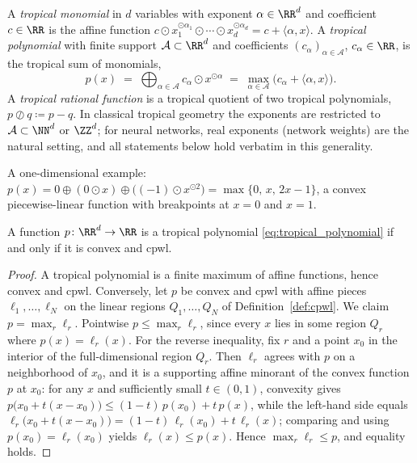 \begin{definition}\label{def:tropical_polynomial}
A \emph{tropical monomial} in $d$ variables with exponent $\alpha \in \RR^{d}$ and coefficient $c \in \RR$ is the affine function $c \odot x_1^{\odot \alpha_1} \odot \cdots \odot x_d^{\odot \alpha_d} = c + \langle \alpha, x \rangle$. A \emph{tropical polynomial} with finite support $\mathcal{A} \subset \RR^{d}$ and coefficients $(c_{\alpha})_{\alpha \in \mathcal{A}}$, $c_\alpha \in \RR$, is the tropical sum of monomials,
\begin{equation}
	p(x) \;=\; \bigoplus_{\alpha \in \mathcal{A}} c_{\alpha} \odot x^{\odot \alpha}
	\;=\; \max_{\alpha \in \mathcal{A}} \bigl( c_{\alpha} + \langle \alpha, x \rangle \bigr).
	\label{eq:tropical_polynomial}
\end{equation}
A \emph{tropical rational function} is a tropical quotient of two tropical polynomials, $p \oslash q \coloneqq p - q$. In classical tropical geometry \cite{MaclaganSturmfels2015tropical} the exponents are restricted to $\mathcal{A} \subset \NN^{d}$ or $\ZZ^{d}$; for neural networks, real exponents (network weights) are the natural setting, and all statements below hold verbatim in this generality.
\end{definition}

A one-dimensional example: $p(x) = 0 \oplus (0 \odot x) \oplus \bigl((-1) \odot x^{\odot 2}\bigr) = \max\{0,\, x,\, 2x - 1\}$, a convex piecewise-linear function with breakpoints at $x = 0$ and $x = 1$.

\begin{observation}\label{obs:tropical_convex_cpwl}
A function $p \colon \RR^d \to \RR$ is a tropical polynomial \eqref{eq:tropical_polynomial} if and only if it is convex and \ac{cpwl}.
\end{observation}

\begin{proof}
A tropical polynomial is a finite maximum of affine functions, hence convex and \ac{cpwl}. Conversely, let $p$ be convex and \ac{cpwl} with affine pieces $\ell_1, \ldots, \ell_N$ on the linear regions $Q_1, \ldots, Q_N$ of Definition~\ref{def:cpwl}. We claim $p = \max_r \ell_r$. Pointwise $p \le \max_r \ell_r$, since every $x$ lies in some region $Q_r$ where $p(x) = \ell_r(x)$. For the reverse inequality, fix $r$ and a point $x_0$ in the interior of the full-dimensional region $Q_r$. Then $\ell_r$ agrees with $p$ on a neighborhood of $x_0$, and it is a supporting affine minorant of the convex function $p$ at $x_0$: for any $x$ and sufficiently small $t \in (0, 1)$, convexity gives $p\bigl(x_0 + t(x - x_0)\bigr) \le (1-t)\, p(x_0) + t\, p(x)$, while the left-hand side equals $\ell_r\bigl(x_0 + t(x-x_0)\bigr) = (1-t)\,\ell_r(x_0) + t\,\ell_r(x)$; comparing and using $p(x_0) = \ell_r(x_0)$ yields $\ell_r(x) \le p(x)$. Hence $\max_r \ell_r \le p$, and equality holds.
\end{proof}

